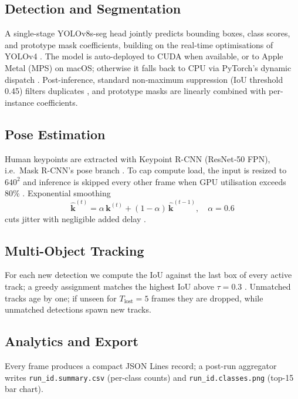 \subsection{Detection and Segmentation}
A single-stage YOLOv8s-seg head jointly predicts bounding boxes, class scores, and prototype mask coefficients, building on the real‐time optimisations of YOLOv4 \cite{bochkovskiy2020yolov4}.  
The model is auto-deployed to CUDA when available, or to Apple Metal (MPS) on macOS; otherwise it falls back to CPU via PyTorch's dynamic dispatch \cite{paszke2019pytorch}.  
Post-inference, standard non‐maximum suppression (IoU threshold 0.45) filters duplicates \cite{neubeck2006efficient}, and prototype masks are linearly combined with per-instance coefficients.

\subsection{Pose Estimation}
Human keypoints are extracted with Keypoint R-CNN (ResNet‐50 FPN), i.e.\ Mask R-CNN's pose branch \cite{he2017mask}.  
To cap compute load, the input is resized to $640^2$ and inference is skipped every other frame when GPU utilisation exceeds 80\% \cite{cao2018openpose}.  
Exponential smoothing
\[
  \hat{\mathbf{k}}^{(t)} = \alpha\,\mathbf{k}^{(t)} + (1-\alpha)\,\hat{\mathbf{k}}^{(t-1)},\quad
  \alpha = 0.6
\]
cuts jitter with negligible added delay \cite{brown1959exponentially}.

\subsection{Multi-Object Tracking}
For each new detection we compute the IoU against the last box of every active track; a greedy assignment matches the highest IoU above $\tau=0.3$ \cite{bochinski2017high}.  
Unmatched tracks age by one; if unseen for $T_{\text{lost}}=5$ frames they are dropped, while unmatched detections spawn new tracks.

\subsection{Analytics and Export}
Every frame produces a compact JSON Lines record; a post-run aggregator writes \texttt{run\_id.summary.csv} (per-class counts) and \texttt{run\_id.classes.png} (top-15 bar chart).

